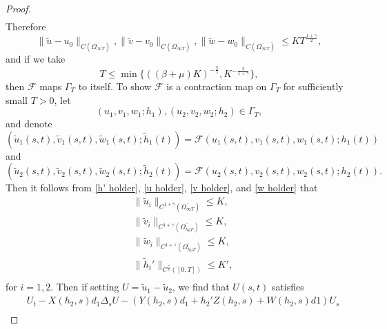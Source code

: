 \documentclass[11pt]{amsart}
\numberwithin{equation}{section}
\theoremstyle{plain}
\theoremstyle{definition}
\begin{document}
\begin{proof}
\begin{equation}
\begin{aligned}
			\end{aligned}
		\end{equation}
		Therefore 
		\begin{equation}
		\lVert \widetilde u-u_0 \rVert_{C(\overline{\Omega_{\infty T}})}, \lVert \widetilde v-v_0 \rVert_{C(\overline{\Omega_{\infty T}})}, \lVert \widetilde w-w_0 \rVert_{C(\overline{\Omega_{\infty T}})} \leq KT^{\frac{1+\gamma}{2}},	
		\end{equation}
and if we take 
\begin{equation*}
	T \leq \min \{((\beta+\mu)K)^{-\frac{2}{\gamma}},K^{-\frac{2}{1+\gamma}}\},
\end{equation*}
then $\mathcal{F}$ maps $\Gamma_T$ to itself. To show $\mathcal{F}$ is a contraction map on $\Gamma_T$ for sufficiently small $T>0$, let 
\begin{equation*}
	(u_1,v_1,w_1;h_1),(u_2,v_2,w_2;h_2)\in \Gamma_T,
\end{equation*}
and denote
\begin{equation*}
	(\widetilde u_1(s,t),\widetilde v_1(s,t),\widetilde w_1(s,t);\widetilde h_1(t))=\mathcal{F}(u_1(s,t),v_1(s,t),w_1(s,t);h_1(t))
\end{equation*}  and 
\begin{equation*}
	(\widetilde u_2(s,t),\widetilde v_2(s,t),\widetilde w_2(s,t);\widetilde h_2(t))=\mathcal{F}(u_2(s,t),v_2(s,t),w_2(s,t);h_2(t)).
\end{equation*}
Then it follows from \cref{h' holder}, \cref{u holder}, \cref{v holder}, and \cref{w holder} that 
		\begin{equation*}
			\begin{aligned}
				&\lVert \widetilde u_i \rVert_{C^{1+\gamma}(\overline{\Omega_{\infty T}})} \leq K,\\
				&\lVert \widetilde v_i \rVert_{C^{1+\gamma}(\overline{\Omega_{h_0 T}})} \leq K,\\
				&\lVert \widetilde w_i \rVert_{C^{1+\gamma}(\overline{\Omega_{h_0 T}})} \leq K,\\
				&\lVert {\widetilde h_i}' \rVert_{C^{\frac{\gamma}{2}}([0,T])} \leq K',\\
			\end{aligned}
		\end{equation*}
		for $i=1,2$. Then if setting $U=\widetilde u_1 -\widetilde u_2$, we find that $U(s,t)$ satisfies
		\begin{equation*}
			\begin{aligned}
				&U_t-X(h_2,s)d_1\Delta_s U-(Y(h_2,s)d_1+h_2'Z(h_2,s)+W(h_2,s)d1)U_s\\

\end{aligned}
\end{equation*}
\end{proof}
\end{document}
